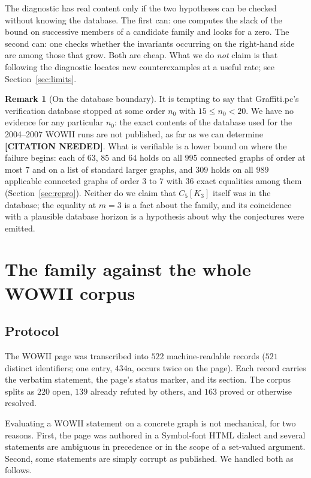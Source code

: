 \documentclass[10pt,a4paper]{article}
\theoremstyle{plain}
\theoremstyle{definition}
\newtheorem{remark}[theorem]{Remark}
\newcommand{\blow}[2]{#1[K_{#2}]}
\begin{document}
The diagnostic has real content only if the two hypotheses can be checked without knowing the
database. The first can: one computes the slack of the bound on successive members of a
candidate family and looks for a zero. The second can: one checks whether the invariants
occurring on the right-hand side are among those that grow. Both are cheap. What we do
\emph{not} claim is that following the diagnostic locates new counterexamples at a useful rate;
see Section~\ref{sec:limits}.

\begin{remark}[On the database boundary]
It is tempting to say that Graffiti.pc's verification database stopped at some order $n_0$ with
$15 \le n_0 < 20$. We have no evidence for any particular $n_0$: the exact contents of the
database used for the 2004--2007 WOWII runs are not published, as far as we can determine
\textbf{[CITATION NEEDED]}. What is verifiable is a lower bound on where the failure begins:
each of $63$, $85$ and $64$ holds on all $995$ connected graphs of order at most $7$ and on a
list of standard larger graphs, and $309$ holds on all $989$ applicable connected graphs of
order $3$ to $7$ with $36$ exact equalities among them (Section~\ref{sec:repro}). Neither do we
claim that $\blow{C_5}{3}$ itself was in the database; the equality at $m=3$ is a fact about the
family, and its coincidence with a plausible database horizon is a hypothesis about why the
conjectures were emitted.
\end{remark}

\section{The family against the whole WOWII corpus}\label{sec:corpus}

\subsection{Protocol}

The WOWII page was transcribed into $522$ machine-readable records ($521$ distinct identifiers;
one entry, $434$a, occurs twice on the page). Each record carries the verbatim statement, the
page's status marker, and its section. The corpus splits as $220$ open, $139$ already refuted by
others, and $163$ proved or otherwise resolved.

Evaluating a WOWII statement on a concrete graph is not mechanical, for two reasons. First, the
page was authored in a Symbol-font HTML dialect and several statements are ambiguous in
precedence or in the scope of a set-valued argument. Second, some statements are simply corrupt
as published. We handled both as follows.
\end{document}
